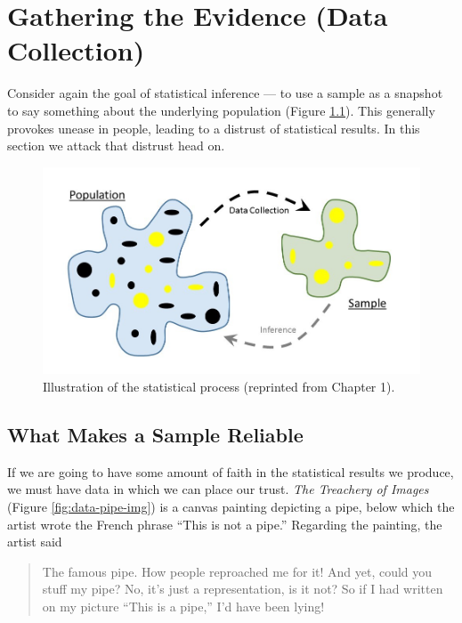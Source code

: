 \documentclass[]{book}
\theoremstyle{plain}
\theoremstyle{mydefn}
\theoremstyle{myexmpl}
\theoremstyle{remark}
\begin{document}
\chapter{Gathering the Evidence (Data Collection)}\label{Data}

Consider again the goal of statistical inference --- to use a sample as
a snapshot to say something about the underlying population (Figure
\ref{fig:data-statistical-process}). This generally provokes unease in
people, leading to a distrust of statistical results. In this section we
attack that distrust head on.

\begin{figure}

{\centering \includegraphics[width=0.8\linewidth]{images/Basics-Stat-Process} 

}

\caption{Illustration of the statistical process (reprinted from Chapter 1).}\label{fig:data-statistical-process}
\end{figure}

\section{What Makes a Sample
Reliable}\label{what-makes-a-sample-reliable}

If we are going to have some amount of faith in the statistical results
we produce, we must have data in which we can place our trust. \emph{The
Treachery of Images} (Figure \ref{fig:data-pipe-img}) is a canvas
painting depicting a pipe, below which the artist wrote the French
phrase ``This is not a pipe.'' Regarding the painting, the artist said

\begin{quote}
The famous pipe. How people reproached me for it! And yet, could you
stuff my pipe? No, it's just a representation, is it not? So if I had
written on my picture ``This is a pipe,'' I'd have been lying!
\end{quote}
\end{document}
